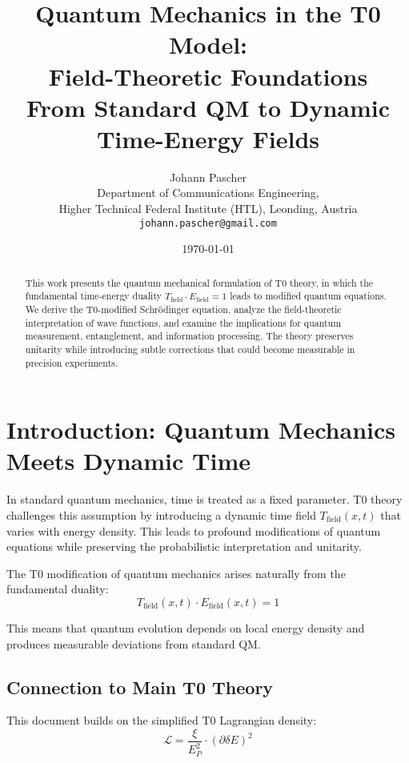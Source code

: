 \documentclass[12pt,a4paper]{article}
\title{Quantum Mechanics in the T0 Model: \\
	Field-Theoretic Foundations \\
	\large From Standard QM to Dynamic Time-Energy Fields}
\author{Johann Pascher\\
	Department of Communications Engineering, \\Higher Technical Federal Institute (HTL), Leonding, Austria\\
	\texttt{johann.pascher@gmail.com}}
\date{\today}
\newcommand{\deltaE}{\delta E}
\newcommand{\Lag}{\mathcal{L}}
\newcommand{\xipar}{\xi}
\newcommand{\EPlanck}{E_P}
\theoremstyle{definition}
\theoremstyle{remark}
\begin{document}
	
	\maketitle
	
	\begin{abstract}
		This work presents the quantum mechanical formulation of T0 theory, in which the fundamental time-energy duality $T_{\text{field}} \cdot E_{\text{field}} = 1$ leads to modified quantum equations. We derive the T0-modified Schrödinger equation, analyze the field-theoretic interpretation of wave functions, and examine the implications for quantum measurement, entanglement, and information processing. The theory preserves unitarity while introducing subtle corrections that could become measurable in precision experiments.
	\end{abstract}
	
	\tableofcontents
	\newpage
	
	\section{Introduction: Quantum Mechanics Meets Dynamic Time}
	
	In standard quantum mechanics, time is treated as a fixed parameter. T0 theory challenges this assumption by introducing a dynamic time field $T_{\text{field}}(x,t)$ that varies with energy density. This leads to profound modifications of quantum equations while preserving the probabilistic interpretation and unitarity.
	
	\begin{tcolorbox}[colback=blue!5!white,colframe=blue!75!black,title=Central Insight]
		The T0 modification of quantum mechanics arises naturally from the fundamental duality:
		$$T_{\text{field}}(x,t) \cdot E_{\text{field}}(x,t) = 1$$
		
		This means that quantum evolution depends on local energy density and produces measurable deviations from standard QM.
	\end{tcolorbox}
	
	\subsection{Connection to Main T0 Theory}
	
	This document builds on the simplified T0 Lagrangian density:
	\begin{equation}
		\Lag = \frac{\xipar}{\EPlanck^2} \cdot (\partial \deltaE)^2
	\end{equation}
	
\end{document}

